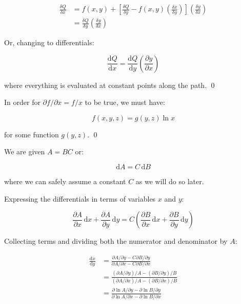 \documentclass[12pt]{article}
\begin{document}
\begin{equation}
    \begin{split}
        \frac{\delta Q}{\delta x} &= f(x, y) + \left[ \frac{\delta Q}{\delta y} - f(x, y) \left( \frac{\delta x}{\delta y} \right) \right] \left( \frac{\delta y}{\delta x} \right) \\
        &= \frac{\delta Q}{\delta y} \left( \frac{\delta y}{\delta x} \right)
    \end{split}
\end{equation}

Or, changing to differentials:

\begin{equation}
    \frac{\mathrm{d}Q}{\mathrm{d}x} = \frac{\mathrm{d}Q}{\mathrm{d}y} \left( \frac{\partial y}{\partial x} \right)
\end{equation}

where everything is evaluated at constant points along the path.
\qed


In order for $\partial f/\partial x = f/x$ to be true, we must have:

\begin{equation}
    f(x, y, z) = g(y, z) \ln{x}
\end{equation}

for some function $g(y, z)$.
\qed


We are given $A = BC$ or:

\begin{equation}
    \mathrm{d}A = C \, \mathrm{d}B
\end{equation}

where we can safely assume a constant $C$ as we will do so later.

Expressing the differentials in terms of variables $x$ and $y$:

\begin{equation}
    \frac{\partial A}{\partial x} \, \mathrm{d}x + \frac{\partial A}{\partial y} \, \mathrm{d}y = C \left( \frac{\partial B}{\partial x} \, \mathrm{d}x + \frac{\partial B}{\partial y} \, \mathrm{d}y \right)
\end{equation}

Collecting terms and dividing both the numerator and denominator by $A$:

\begin{equation}
    \begin{split}
        \frac{\mathrm{d}x}{\mathrm{d}y} &= \frac{\partial A/\partial y - C \partial B/\partial y}{\partial A/\partial x - C \partial B/\partial x} \\
        &= \frac{(\partial A/\partial y)/A - (\partial B/\partial y)/B}{(\partial A/\partial x)/A - (\partial B/\partial x)/B} \\
        &= \frac{\partial \ln{A}/\partial y - \partial \ln{B}/\partial y}{\partial \ln{A}/\partial x - \partial \ln{B}/\partial x} \\
    \end{split}
\end{equation}
\end{document}
